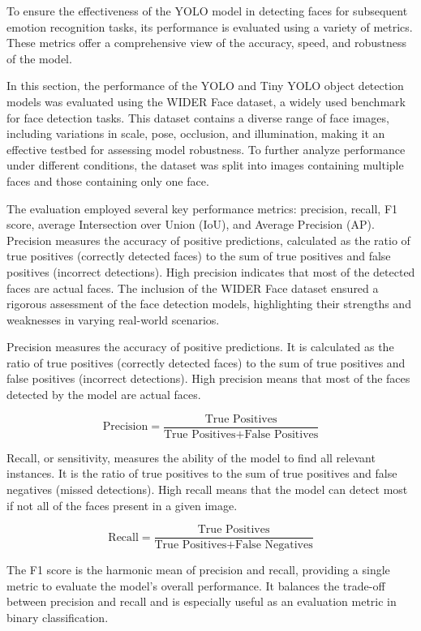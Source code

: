 To ensure the effectiveness of the YOLO model in detecting faces for subsequent emotion recognition tasks, its performance is evaluated using a variety of metrics. These metrics offer a comprehensive view of the accuracy, speed, and robustness of the model.

In this section, the performance of the YOLO and Tiny YOLO object detection models was evaluated using the WIDER Face dataset, a widely used benchmark for face detection tasks. This dataset contains a diverse range of face images, including variations in scale, pose, occlusion, and illumination, making it an effective testbed for assessing model robustness. To further analyze performance under different conditions, the dataset was split into images containing multiple faces and those containing only one face.

The evaluation employed several key performance metrics: precision, recall, F1 score, average Intersection over Union (IoU), and Average Precision (AP). Precision measures the accuracy of positive predictions, calculated as the ratio of true positives (correctly detected faces) to the sum of true positives and false positives (incorrect detections). High precision indicates that most of the detected faces are actual faces. The inclusion of the WIDER Face dataset ensured a rigorous assessment of the face detection models, highlighting their strengths and weaknesses in varying real-world scenarios.

Precision measures the accuracy of positive predictions. It is calculated as the ratio of true positives (correctly detected faces) to the sum of true positives and false positives (incorrect detections). High precision means that most of the faces detected by the model are actual faces.

\[
\text{Precision} = \frac{\text{True Positives}}{\text{True Positives} + \text{False Positives}}
\]

Recall, or sensitivity, measures the ability of the model to find all relevant instances. It is the ratio of true positives to the sum of true positives and false negatives (missed detections). High recall means that the model can detect most if not all of the faces present in a given image.

\[
\text{Recall} = \frac{\text{True Positives}}{\text{True Positives} + \text{False Negatives}}
\]

The F1 score is the harmonic mean of precision and recall, providing a single metric to evaluate the model's overall performance. It balances the trade-off between precision and recall and is especially useful as an evaluation metric in binary classification.

